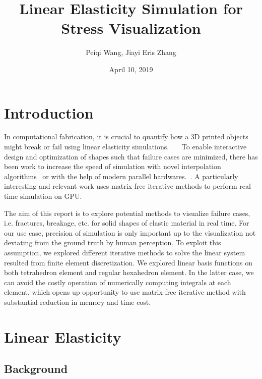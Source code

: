 \documentclass[11pt,titlepage]{article}
\title{Linear Elasticity Simulation for Stress Visualization}
\author{Peiqi Wang, Jiayi Eris Zhang}
\date{April 10, 2019}
\begin{document}
\maketitle
\tableofcontents

\newpage
\section{Introduction}

In computational fabrication, it is crucial to quantify how a 3D printed objects might break or fail using linear elasticity simulations.~\cite{zhou_panetta_zorin_2013}~\cite{langlois_shamir_dror_matusik_levin_2016}~\cite{langlois_shamir_dror_matusik_levin_2016} To enable interactive design and optimization of shapes such that failure cases are minimized, there has been work to increase the speed of simulation with novel interpolation algorithms~\cite{schulz_xu_zhu_zheng_grinspun_matusik_2017} or with the help of modern parallel hardwares.~\cite{dick_georgii_westermann_2011}. A particularly interesting and relevant work uses matrix-free iterative methods to perform real time simulation on GPU.~\cite{yadav_suresh_2014}~\cite{marix_free_voxel_fem_thesis_2018}


 
The aim of this report is to explore potential methods to visualize failure cases, i.e. fractures, breakage, etc. for solid shapes of elastic material in real time. For our use case, precision of simulation is only important up to the visualization not deviating from the ground truth by human perception. To exploit this assumption, we explored different iterative methods to solve the linear system resulted from finite element discretization. We explored linear basis functions on both tetrahedron element and regular hexahedron element. In the latter case, we can avoid the costly operation of numerically computing integrals at each element, which opens up opportunity to use matrix-free iterative method with substantial reduction in memory and time cost.


\section{Linear Elasticity}

\subsection{Background}
\end{document}
